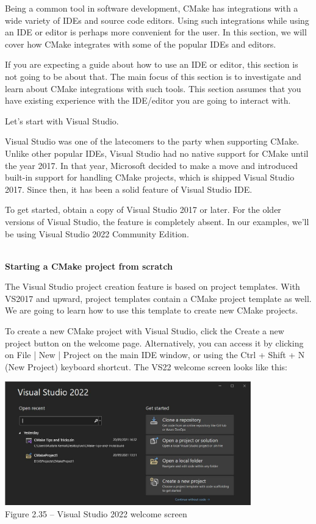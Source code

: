 
Being a common tool in software development, CMake has integrations with a wide variety of IDEs and source code editors. Using such integrations while using an IDE or editor is perhaps more convenient for the user. In this section, we will cover how CMake integrates with some of the popular IDEs and editors.

If you are expecting a guide about how to use an IDE or editor, this section is not going to be about that. The main focus of this section is to investigate and learn about CMake integrations with such tools. This section assumes that you have existing experience with the IDE/editor you are going to interact with.

Let's start with Visual Studio.


Visual Studio was one of the latecomers to the party when supporting CMake. Unlike other popular IDEs, Visual Studio had no native support for CMake until the year 2017. In that year, Microsoft decided to make a move and introduced built-in support for handling CMake projects, which is shipped Visual Studio 2017. Since then, it has been a solid feature of Visual Studio IDE.

To get started, obtain a copy of Visual Studio 2017 or later. For the older versions of Visual Studio, the feature is completely absent. In our examples, we'll be using Visual Studio 2022 Community Edition.

\hspace*{\fill} \\ %
\noindent
\textbf{Starting a CMake project from scratch}

The Visual Studio project creation feature is based on project templates. With VS2017 and upward, project templates contain a CMake project template as well. We are going to learn how to use this template to create new CMake projects.

To create a new CMake project with Visual Studio, click the Create a new project button on the welcome page. Alternatively, you can access it by clicking on File | New | Project on the main IDE window, or using the Ctrl + Shift + N (New Project) keyboard shortcut. The VS22 welcome screen looks like this:

\begin{center}
\includegraphics[width=0.8\textwidth]{content/1/chapter2/images/35.jpg}\\
Figure 2.35 – Visual Studio 2022 welcome screen
\end{center}

